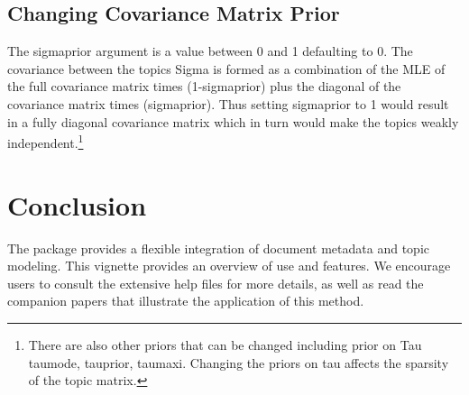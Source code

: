 \documentclass[nojss]{jss}
\begin{document}
\subsection{Changing Covariance Matrix Prior}

The sigmaprior argument is a value between 0 and 1 defaulting to 0.  The covariance between the topics
 Sigma is formed as a combination of the MLE of the full covariance matrix times (1-sigmaprior) plus the
 diagonal of the covariance matrix times (sigmaprior).  Thus setting sigmaprior to 1 would result in a
 fully diagonal covariance matrix which in turn would make the topics weakly independent.\footnote{There are also other priors that can be changed including prior on Tau taumode, tauprior, taumaxi. Changing the priors on tau affects the sparsity of the topic matrix.}

\section{Conclusion}

The   package provides a flexible integration of document metadata and topic modeling. This vignette provides an overview of use and features. We encourage users to consult the extensive help files for more details, as well as read the companion papers that illustrate the application of this method.

\clearpage
{}

\end{document}
